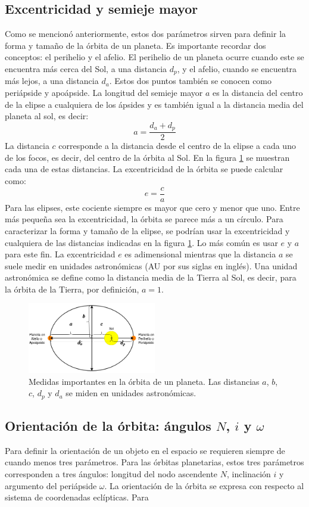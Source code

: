 \documentclass[a4paper,10pt]{article}
\begin{document}
\subsection{Excentricidad y semieje mayor}
Como se mencionó anteriormente, estos dos parámetros sirven para definir la forma y tamaño de la órbita de un planeta. Es importante recordar dos conceptos: el perihelio y el afelio. El perihelio de un planeta ocurre cuando este se encuentra más cerca del Sol, a una distancia $d_p$, y el afelio, cuando se encuentra más lejos, a una distancia $d_a$. Estos dos puntos también se conocen como periápside y apoápside. La longitud del semieje mayor $a$ es la distancia del centro de la elipse a cualquiera de los ápsides y es también igual a la distancia media del planeta al sol, es decir:
\[a = \frac{d_a + d_p}{2}\]
La distancia $c$ corresponde a la distancia desde el centro de la elipse a cada uno de los focos, es decir, del centro de la órbita al Sol. En la figura \ref{fig:Ellipse} se muestran cada una de estas distancias. La excentricidad de la órbita se puede calcular como:
\begin{equation}
  e = \frac{c}{a}
\end{equation}
Para las elipses, este cociente siempre es mayor que cero y menor que uno. Entre más pequeña sea la excentricidad, la órbita se parece más a un círculo. Para caracterizar la forma y tamaño de la elipse, se podrían usar la excentricidad y cualquiera de las distancias indicadas en la figura \ref{fig:Ellipse}. Lo más común es usar $e$ y $a$ para este fin. La excentricidad $e$ es adimensional mientras que la distancia $a$ se suele medir en unidades astronómicas (AU por sus siglas en inglés). Una unidad astronómica se define como la distancia media de la Tierra al Sol, es decir, para la órbita de la Tierra, por definición, $a=1$.
\begin{figure}
  \centering
  \includegraphics[width=0.5\textwidth]{Figures/EccentricitySemimajorAxis.png}
  \caption{Medidas importantes en la órbita de un planeta. Las distancias $a$, $b$, $c$, $d_p$ y $d_a$ se miden en unidades astronómicas.}
  \label{fig:Ellipse}
\end{figure}

\subsection{Orientación de la órbita: ángulos $N$, $i$ y $\omega$}
Para definir la orientación de un objeto en el espacio se requieren siempre de cuando menos tres parámetros. Para las órbitas planetarias, estos tres parámetros corresponden a tres ángulos: longitud del nodo ascendente $N$, inclinación $i$ y argumento del periápside $\omega$. La orientación de la órbita se expresa con respecto al sistema de coordenadas eclípticas. Para 
\end{document}
